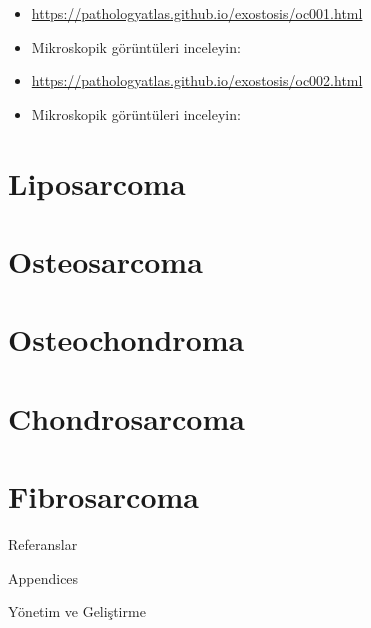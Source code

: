 \documentclass[
  letterpaper,
  DIV=11,
  numbers=noendperiod]{scrreprt}
\newlength{\cslhangindent}
\newlength{\cslentryspacingunit} %
\newenvironment{CSLReferences}[2] %
 {%
  \setlength{\parindent}{0pt}
  \ifodd #1
  \let\oldpar\par
  \def\par{\hangindent=\cslhangindent\oldpar}
  \fi
  \setlength{\parskip}{#2\cslentryspacingunit}
 }%
 {}
\begin{document}
\begin{itemize}
\item
  \url{https://pathologyatlas.github.io/exostosis/oc001.html}
\item
  Mikroskopik görüntüleri inceleyin:
\end{itemize}

\begin{itemize}
\item
  \url{https://pathologyatlas.github.io/exostosis/oc002.html}
\item
  Mikroskopik görüntüleri inceleyin:
\end{itemize}

\hypertarget{liposarcoma}{%
\section{Liposarcoma}\label{liposarcoma}}

\hypertarget{osteosarcoma}{%
\section{Osteosarcoma}\label{osteosarcoma}}

\hypertarget{osteochondroma}{%
\section{Osteochondroma}\label{osteochondroma}}

\hypertarget{chondrosarcoma}{%
\section{Chondrosarcoma}\label{chondrosarcoma}}

\hypertarget{fibrosarcoma}{%
\section{Fibrosarcoma}\label{fibrosarcoma}}

Referanslar

\hypertarget{refs}{}
\begin{CSLReferences}{0}{0}
\end{CSLReferences}

Appendices

Yönetim ve Geliştirme
\end{document}
